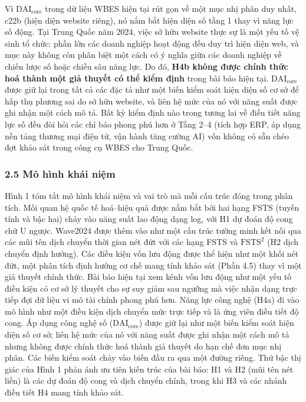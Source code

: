 \documentclass[12pt,a4paper]{article}
\begin{document}
Vì \(\mathrm{DAI}_{\text{core}}\) trong dữ liệu WBES hiện tại rút gọn về
một mục nhị phân duy nhất, c22b (hiện diện website riêng), nó nắm bắt
hiện diện số tầng 1 thay vì năng lực số động. Tại Trung Quốc năm 2024,
việc sở hữu website thực sự là một yếu tố vệ sinh tổ chức: phần lớn các
doanh nghiệp hoạt động đều duy trì hiện diện web, và mục này không còn
phân biệt một cách có ý nghĩa giữa các doanh nghiệp về chiến lược số
hoặc chiều sâu năng lực. Do đó, \textbf{H4b không được chính thức hoá
thành một giả thuyết có thể kiểm định} trong bài báo hiện tại.
\(\mathrm{DAI}_{\text{core}}\) được giữ lại trong tất cả các đặc tả như
một biến kiểm soát hiện diện số cơ sở để hấp thụ phương sai do sở hữu
website, và liên hệ mức của nó với năng suất được ghi nhận một cách mô
tả. Bất kỳ kiểm định nào trong tương lai về điều tiết năng lực số đều
đòi hỏi các chỉ báo phong phú hơn ở Tầng 2--4 (tích hợp ERP, áp dụng nền
tảng thương mại điện tử, vận hành tăng cường AI) vốn không có sẵn chéo
đợt khảo sát trong công cụ WBES cho Trung Quốc.

\hypertarget{25-muxf4-huxecnh-khuxe1i-niux1ec7m}{%
\subsubsection{2.5 Mô hình khái
niệm}\label{25-muxf4-huxecnh-khuxe1i-niux1ec7m}}

Hình 1 tóm tắt mô hình khái niệm và vai trò mà mỗi cấu trúc đóng trong
phân tích. Mối quan hệ quốc tế hoá--hiệu quả được nắm bắt bởi hai hạng
FSTS (tuyến tính và bậc hai) chảy vào năng suất lao động dạng log, với
H1 dự đoán độ cong chữ U ngược. Wave2024 được thêm vào như một cấu trúc
tường minh kết nối qua các mũi tên dịch chuyển thời gian nét đứt với các
hạng FSTS và \(\mathrm{FSTS}^2\) (H2 dịch chuyển định hướng). Các điều
kiện vốn lưu động được thể hiện như một khối nét đứt, một phân tích định
hướng cơ chế mang tính khảo sát (Phần 4.5) thay vì một giả thuyết chính
thức. Bài báo hiện tại xem kênh vốn lưu động như một yếu tố điều kiện có
cơ sở lý thuyết cho sự suy giảm sau ngưỡng mà việc nhận dạng trực tiếp
đợi dữ liệu vi mô tài chính phong phú hơn. Năng lực công nghệ (H4a) đi
vào mô hình như một điều kiện dịch chuyển mức trực tiếp và là ứng viên
điều tiết độ cong. Áp dụng công nghệ số (\(\mathrm{DAI}_{\text{core}}\))
được giữ lại như một biến kiểm soát hiện diện số cơ sở; liên hệ mức của
nó với năng suất được ghi nhận một cách mô tả nhưng không được chính
thức hoá thành giả thuyết do hạn chế đơn mục nhị phân. Các biến kiểm
soát chảy vào biến đầu ra qua một đường riêng. Thứ bậc thị giác của Hình
1 phản ánh ưu tiên kiến trúc của bài báo: H1 và H2 (mũi tên nét liền) là
các dự đoán độ cong và dịch chuyển chính, trong khi H3 và các nhánh điều
tiết H4 mang tính khảo sát.
\end{document}
